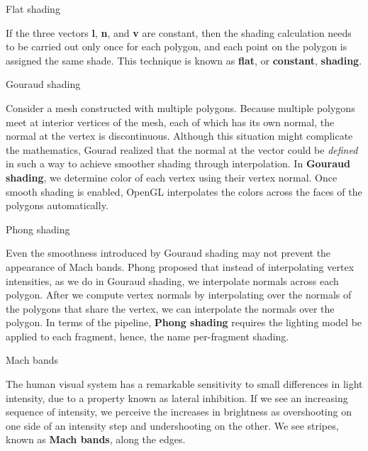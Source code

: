 \documentclass[10pt,a4paper]{article}
\begin{document}
\begin{enumerate}
		{\large \item Flat shading}
				
			 If the three vectors \textbf{l}, \textbf{n}, and \textbf{v} are constant, then the shading calculation needs to be carried out only once for each polygon, and each point on the polygon is assigned the same shade. This technique is known as \textbf{flat}, or \textbf{constant}, \textbf{shading}.\\
			 
		{\large \item Gouraud shading}
				
			Consider a mesh constructed with multiple polygons. Because multiple polygons meet at interior vertices of the mesh, each of which has its own normal, the normal at the vertex is discontinuous. Although this situation might complicate the mathematics, Gourad realized that the normal at the vector could be \textit{defined} in such a way to achieve smoother shading through interpolation. In\textbf{ Gouraud shading}, we determine color of each vertex using their vertex normal. Once smooth shading is enabled, OpenGL interpolates the colors across the faces of the polygons automatically.\\
			
		{\large \item Phong shading}
				
			Even the smoothness introduced by Gouraud shading may not prevent the appearance of Mach bands. Phong proposed that instead of interpolating vertex intensities, as we do in Gouraud shading, we interpolate normals across each polygon. After we compute vertex normals by interpolating over the normals of the polygons that share the vertex, we can interpolate the normals over the polygon. In terms of the pipeline, \textbf{Phong shading} requires the lighting model be applied to each fragment, hence, the name per-fragment shading.\\
			
		{\large \item Mach bands}
			
			The human visual system has a remarkable sensitivity to small differences in light intensity, due to a property known as lateral inhibition. If we see an increasing sequence of intensity, we perceive the increases in brightness as overshooting on one side of an intensity step and undershooting on the other. We see stripes, known as \textbf{Mach bands}, along the edges.\\
		

\end{enumerate}
\end{document}
